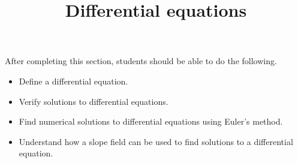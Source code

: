 \documentclass{ximera}
\title{Differential equations}
\begin{document}
\begin{abstract}
\end{abstract}

\maketitle

\begin{sectionOutcomes}

After completing this section, students should be able to do the following.

\begin{itemize}
	\item Define a differential equation.
	\item Verify solutions to differential equations.
	\item Find numerical solutions to differential equations using Euler's method.
	\item Understand how a slope field can be used to find solutions to a differential equation.
\end{itemize}

\end{sectionOutcomes}
\end{document}
